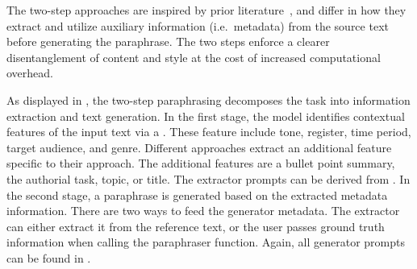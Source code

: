The two-step approaches are inspired by prior literature~\citep{bevendorff_overview_2024, ayele_overview_2024}, and differ in how they extract and utilize auxiliary information (i.e.\ metadata) from the source text before generating the paraphrase. 
The two steps enforce a clearer disentanglement of content and style at the cost of increased computational overhead.

As displayed in , the two-step paraphrasing decomposes the task into information extraction and text generation. 
In the first stage, the model identifies contextual features of the input text via a \pextractor{}.
These feature include tone, register, time period, target audience, and genre.
Different approaches extract an additional feature specific to their approach.
The additional features are a bullet point summary, the authorial task, topic, or title. 
The extractor prompts can be derived from .
In the second stage, a paraphrase is generated based on the extracted metadata information. 
There are two ways to feed the generator metadata.
The extractor can either extract it from the reference text, or the user passes ground truth information when calling the paraphraser function.
Again, all generator prompts can be found in .

